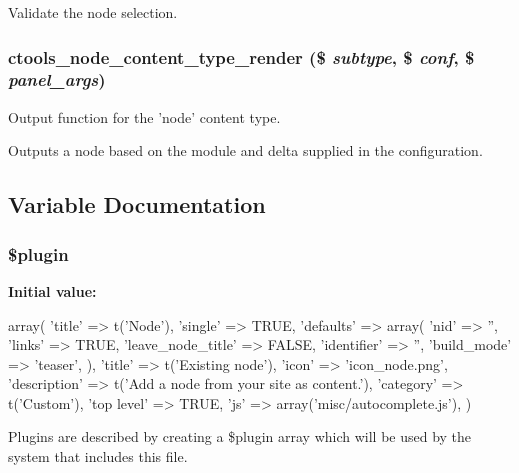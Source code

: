 \label{ctools_2plugins_2content__types_2node_2node_8inc_a523e47b1675b594c4294337fd11d13f9}
Validate the node selection. \hypertarget{ctools_2plugins_2content__types_2node_2node_8inc_a064008098d492950aa49baa827c38e01}{
\subsubsection[{ctools\_\-node\_\-content\_\-type\_\-render}]{\setlength{\rightskip}{0pt plus 5cm}ctools\_\-node\_\-content\_\-type\_\-render (\$ {\em subtype}, \/  \$ {\em conf}, \/  \$ {\em panel\_\-args})}}
\label{ctools_2plugins_2content__types_2node_2node_8inc_a064008098d492950aa49baa827c38e01}
Output function for the 'node' content type.

Outputs a node based on the module and delta supplied in the configuration. 

\subsection{Variable Documentation}
\hypertarget{ctools_2plugins_2content__types_2node_2node_8inc_ada8a7130088351710bb02ed622d6bf65}{
\subsubsection[{\$plugin}]{\setlength{\rightskip}{0pt plus 5cm}\$plugin}}
\label{ctools_2plugins_2content__types_2node_2node_8inc_ada8a7130088351710bb02ed622d6bf65}
{\bfseries Initial value:}
\begin{DoxyCode}
 array(
  'title' => t('Node'),
  'single' => TRUE,
  'defaults' => array(
    'nid' => '',
    'links' => TRUE,
    'leave_node_title' => FALSE,
    'identifier' => '',
    'build_mode' => 'teaser',
  ),
  'title' => t('Existing node'),
  'icon' => 'icon_node.png',
  'description' => t('Add a node from your site as content.'),
  'category' => t('Custom'),
  'top level' => TRUE,
  'js' => array('misc/autocomplete.js'),
)
\end{DoxyCode}
Plugins are described by creating a \$plugin array which will be used by the system that includes this file. 
